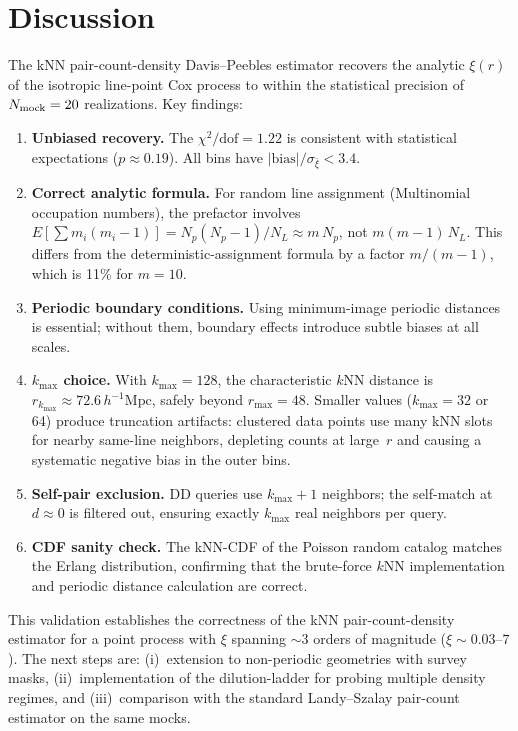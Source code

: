 \documentclass[11pt]{article}
\begin{document}
\section{Discussion}

The kNN pair-count-density Davis--Peebles estimator recovers the
analytic $\xi(r)$ of the isotropic line-point Cox process to within the
statistical precision of $N_{\rm mock} = 20$ realizations.  Key
findings:

\begin{enumerate}
\item \textbf{Unbiased recovery.}  The $\chi^2/\mathrm{dof} = 1.22$ is
  consistent with statistical expectations ($p \approx 0.19$).  All bins
  have $|\mathrm{bias}|/\sigma_{\bar\xi} < 3.4$.

\item \textbf{Correct analytic formula.}  For random line assignment
  (Multinomial occupation numbers), the prefactor involves
  $E[\sum m_i(m_i{-}1)] = N_p(N_p{-}1)/N_L \approx m\,N_p$, not
  $m(m{-}1)\,N_L$.  This differs from the deterministic-assignment
  formula by a factor $m/(m{-}1)$, which is 11\% for $m = 10$.

\item \textbf{Periodic boundary conditions.}  Using minimum-image
  periodic distances is essential; without them, boundary effects
  introduce subtle biases at all scales.

\item \textbf{$k_{\max}$ choice.}  With $k_{\max} = 128$, the
  characteristic $k$NN distance is $r_{k_{\max}} \approx 72.6\,
  h^{-1}\mathrm{Mpc}$, safely beyond $r_{\max} = 48$.  Smaller values
  ($k_{\max} = 32$ or 64) produce truncation artifacts: clustered data
  points use many kNN slots for nearby same-line neighbors, depleting
  counts at large~$r$ and causing a systematic negative bias in the
  outer bins.

\item \textbf{Self-pair exclusion.}  DD queries use $k_{\max} + 1$
  neighbors; the self-match at $d \approx 0$ is filtered out, ensuring
  exactly $k_{\max}$ real neighbors per query.

\item \textbf{CDF sanity check.}  The kNN-CDF of the Poisson random
  catalog matches the Erlang distribution, confirming that the brute-force
  $k$NN implementation and periodic distance calculation are correct.
\end{enumerate}

This validation establishes the correctness of the kNN pair-count-density
estimator for a point process with $\xi$ spanning $\sim 3$ orders of
magnitude ($\xi \sim 0.03$--$7$).  The next steps are: (i)~extension to
non-periodic geometries with survey masks, (ii)~implementation of
the dilution-ladder for probing multiple density regimes, and
(iii)~comparison with the standard Landy--Szalay pair-count estimator on
the same mocks.
\end{document}
